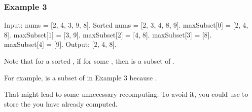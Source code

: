 \documentclass[letterpaper,12pt,english]{book}
\begin{document}
\subsubsection{Example 3}
\label{\detokenize{Dynamic_Programming/05_DP_368_Largest_Divisible_Subset:example-3}}
\begin{sphinxVerbatim}[commandchars=\\\{\}]
Input: nums = [2, 4, 3, 9, 8].
Sorted nums = [2, 3, 4, 8, 9]. 
maxSubset[0] = [2, 4, 8].
maxSubset[1] = [3, 9].
maxSubset[2] = [4, 8].
maxSubset[3] = [8].
maxSubset[4] = [9].
Output: [2, 4, 8].
\end{sphinxVerbatim}

\sphinxAtStartPar
Note that for a sorted , if  for some , then  is a subset of .

\sphinxAtStartPar
For example,  is a subset of  in Example 3 because .

\sphinxAtStartPar
That might lead to some unnecessary recomputing. To avoid it, you could use  to store the  you have already computed.
\end{document}
